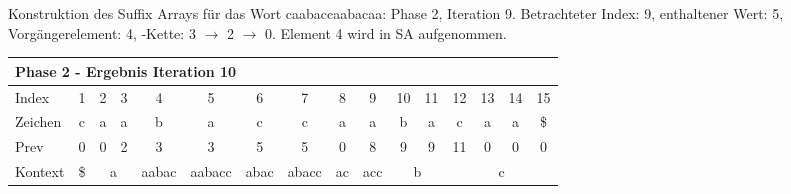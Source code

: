 \begin{table}[H]
\caption[Konstruktion des Suffix Arrays für das Wort caabaccaabacaa: Phase 2, Iteration 9]{Konstruktion des Suffix Arrays für das Wort caabaccaabacaa: Phase 2, Iteration 9. Betrachteter Index: 9, enthaltener Wert: 5, Vorgängerelement: 4, \prevpointer-Kette: 3 $\rightarrow$ 2 $\rightarrow$ 0. Element 4 wird in SA aufgenommen.}
\label{table_complex_example_2_9} 
\end{table}

\begin{table}[H]
\centering
\begin{adjustbox}{max width=\textwidth}
\centering
\begin{tabular}{lccccccccccccccc}
\multicolumn{16}{l}{Phase 2 - Ergebnis Iteration 10}                                                                                                                                                                                                                                                                                          \\ \hline
\multicolumn{1}{l|}{Index}   & 1                       & 2  & 3                       & 4                          & 5                           & 6                         & 7                          & 8                       & 9                        & 10                         & 11                      & 12  & 13  & 14  & 15  \\
\multicolumn{1}{l|}{Zeichen} & c                       & a  & a                       & b                          & a                           & c                         & c                          & a                       & a                        & b                          & a                       & c   & a   & a   & \$  \\
\multicolumn{1}{l|}{Prev}    & 0                       & 0  & 2                       & 3                          & 3                           & 5                         & 5                          & 0                       & 8                        & 9                          & 9                       & 11  & 0   & 0   & 0   \\ \hline
\multicolumn{1}{l|}{Kontext} & \multicolumn{1}{c|}{\$} & \multicolumn{2}{c|}{a}       & \multicolumn{1}{c|}{aabac} & \multicolumn{1}{c|}{aabacc} & \multicolumn{1}{c|}{abac} & \multicolumn{1}{c|}{abacc} & \multicolumn{1}{c|}{ac} & \multicolumn{1}{c|}{acc} & \multicolumn{2}{c|}{b}                               & \multicolumn{4}{c}{c} \\

\end{tabular}
\end{adjustbox}
\end{table}
